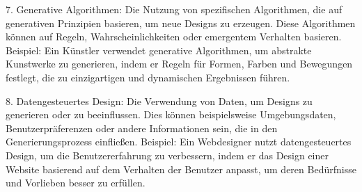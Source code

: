 7. Generative Algorithmen: Die Nutzung von spezifischen Algorithmen, die auf generativen Prinzipien basieren, um neue Designs zu erzeugen. Diese Algorithmen können auf Regeln, Wahrscheinlichkeiten oder emergentem Verhalten basieren. Beispiel: Ein Künstler verwendet generative Algorithmen, um abstrakte Kunstwerke zu generieren, indem er Regeln für Formen, Farben und Bewegungen festlegt, die zu einzigartigen und dynamischen Ergebnissen führen.

8. Datengesteuertes Design: Die Verwendung von Daten, um Designs zu generieren oder zu beeinflussen. Dies können beispielsweise Umgebungsdaten, Benutzerpräferenzen oder andere Informationen sein, die in den Generierungsprozess einfließen. Beispiel: Ein Webdesigner nutzt datengesteuertes Design, um die Benutzererfahrung zu verbessern, indem er das Design einer Website basierend auf dem Verhalten der Benutzer anpasst, um deren Bedürfnisse und Vorlieben besser zu erfüllen.